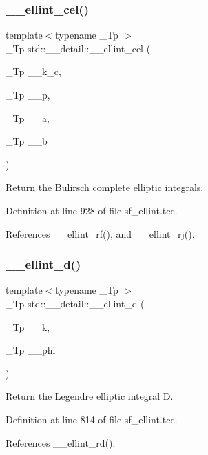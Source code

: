 \subsubsection{\texorpdfstring{\+\_\+\+\_\+ellint\+\_\+cel()}{\_\_ellint\_cel()}}
{\footnotesize\ttfamily template$<$typename \+\_\+\+Tp $>$ \\
\+\_\+\+Tp std\+::\+\_\+\+\_\+detail\+::\+\_\+\+\_\+ellint\+\_\+cel (\begin{DoxyParamCaption}\item[{\+\_\+\+Tp}]{\+\_\+\+\_\+k\+\_\+c,  }\item[{\+\_\+\+Tp}]{\+\_\+\+\_\+p,  }\item[{\+\_\+\+Tp}]{\+\_\+\+\_\+a,  }\item[{\+\_\+\+Tp}]{\+\_\+\+\_\+b }\end{DoxyParamCaption})}

Return the Bulirsch complete elliptic integrals. 

Definition at line 928 of file sf\+\_\+ellint.\+tcc.



References \+\_\+\+\_\+ellint\+\_\+rf(), and \+\_\+\+\_\+ellint\+\_\+rj().

\mbox{\label{namespacestd_1_1____detail_a00da42d89830fd51e9934fe0c5e08b7f}} 
\subsubsection{\texorpdfstring{\+\_\+\+\_\+ellint\+\_\+d()}{\_\_ellint\_d()}}
{\footnotesize\ttfamily template$<$typename \+\_\+\+Tp $>$ \\
\+\_\+\+Tp std\+::\+\_\+\+\_\+detail\+::\+\_\+\+\_\+ellint\+\_\+d (\begin{DoxyParamCaption}\item[{\+\_\+\+Tp}]{\+\_\+\+\_\+k,  }\item[{\+\_\+\+Tp}]{\+\_\+\+\_\+phi }\end{DoxyParamCaption})}

Return the Legendre elliptic integral D. 

Definition at line 814 of file sf\+\_\+ellint.\+tcc.



References \+\_\+\+\_\+ellint\+\_\+rd().

